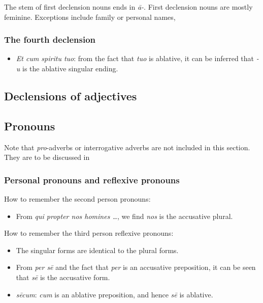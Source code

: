 \documentclass{article}
\newcommand*{\term}[1]{\emph{#1}}
\newcommand*{\corpus}[1]{\emph{#1}}
\begin{document}
The stem of first declension nouns ends in \corpus{\={a}-}.
First declension nouns are mostly feminine.
Exceptions include family or personal names,

\subsubsection{The fourth declension}

\begin{itemize}
    \item \corpus{Et cum spiritu tuo}: from the fact that \corpus{tuo} is ablative,
    it can be inferred that \corpus{-u} is the ablative singular ending.
\end{itemize}

\subsection{Declensions of adjectives}\label{sec:regular-adjective-declension}

\subsection{Pronouns}\label{sec:pronoun}

Note that \term{pro}-adverbs or interrogative adverbs are not included in this section.
They are to be discussed in 

\subsubsection{Personal pronouns and reflexive pronouns}

How to remember the second person pronouns:
\begin{itemize}
    \item From \corpus{qui propter nos homines \dots}, we find \corpus{nos} is the accusative plural.
\end{itemize}

How to remember the third person reflexive pronouns:
\begin{itemize}
    \item The singular forms are identical to the plural forms.
    \item From \corpus{per s\={e}} and the fact that \corpus{per} is an accusative preposition,
    it can be seen that \corpus{s\={e}} is the accusative form. 
    \item \corpus{s\={e}cum}: \corpus{cum} is an ablative preposition, 
    and hence \corpus{s\={e}} is ablative.
\end{itemize}
\end{document}
